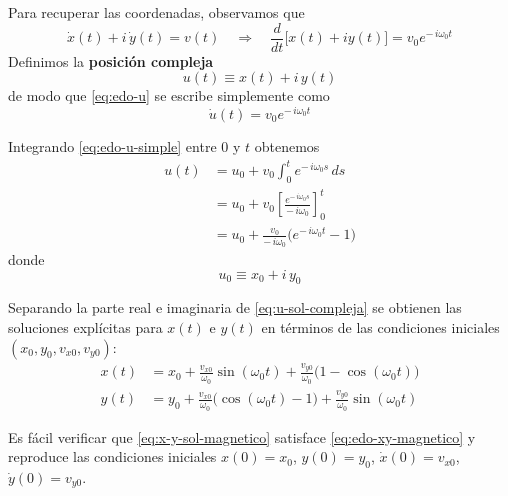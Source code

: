 \documentclass{article}
\begin{document}
Para recuperar las coordenadas, observamos que
\begin{equation}
\dot{x}(t) + i\,\dot{y}(t) = v(t)
\quad\Longrightarrow\quad
\frac{d}{dt}\bigl[x(t)+i y(t)\bigr] = v_{0}e^{-\,i\omega_{0}t}
\label{eq:edo-u}
\end{equation}
Definimos la \textcolor{Cinnabar}{\textbf{posición compleja}}
\begin{equation}
u(t) \equiv x(t) + i\,y(t)
\label{eq:def-u}
\end{equation}
de modo que \eqref{eq:edo-u} se escribe simplemente como
\begin{equation}
\dot{u}(t) = v_{0}e^{-\,i\omega_{0}t}
\label{eq:edo-u-simple}
\end{equation}

Integrando \eqref{eq:edo-u-simple} entre $0$ y $t$ obtenemos
\begin{equation}
\begin{split}
u(t)
&= u_{0}
 + v_{0}\int_{0}^{t} e^{-\,i\omega_{0}s}\,ds \\[4pt]
&= u_{0}
 + v_{0}
   \left[
     \frac{e^{-\,i\omega_{0}s}}{-\,i\omega_{0}}
   \right]_{0}^{t} \\[4pt]
&= u_{0}
 + \frac{v_{0}}{-\,i\omega_{0}}\bigl(e^{-\,i\omega_{0}t}-1\bigr)
\end{split}
\label{eq:u-sol-compleja}
\end{equation}
donde
\begin{equation}
u_{0} \equiv x_{0} + i\,y_{0}
\label{eq:u0-def}
\end{equation}

Separando la parte real e imaginaria de \eqref{eq:u-sol-compleja} se obtienen
las soluciones explícitas para $x(t)$ e $y(t)$ en términos de las condiciones
iniciales $(x_{0},y_{0},v_{x0},v_{y0})$:
\begin{equation}
\begin{split}
x(t)
&= x_{0}
 + \frac{v_{x0}}{\omega_{0}}\sin(\omega_{0}t)
 + \frac{v_{y0}}{\omega_{0}}\bigl(1-\cos(\omega_{0}t)\bigr) \\[4pt]
y(t)
&= y_{0}
 + \frac{v_{x0}}{\omega_{0}}\bigl(\cos(\omega_{0}t)-1\bigr)
 + \frac{v_{y0}}{\omega_{0}}\sin(\omega_{0}t)
\end{split}
\label{eq:x-y-sol-magnetico}
\end{equation}

Es fácil verificar que \eqref{eq:x-y-sol-magnetico} satisface
\eqref{eq:edo-xy-magnetico} y reproduce las condiciones iniciales
$x(0)=x_{0}$, $y(0)=y_{0}$, $\dot{x}(0)=v_{x0}$, $\dot{y}(0)=v_{y0}$.
\end{document}
